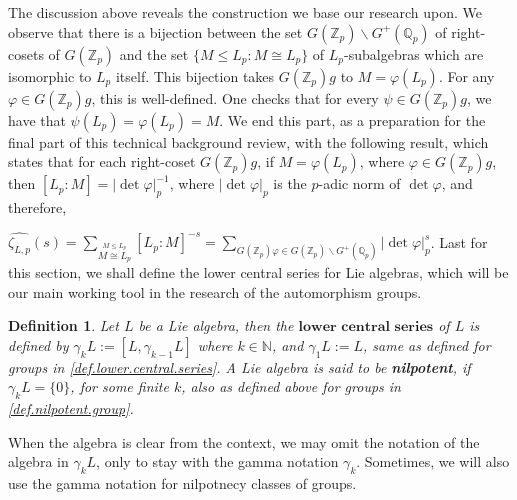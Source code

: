\documentclass[12pt]{article}
\newtheorem{definition}[theorem]{Definition}
\begin{document}
The discussion above reveals the construction we base our research upon.
We observe that there is a bijection between the set $G(\mathbb{Z}_p)\backslash G^+(\mathbb{Q}_p)$ of right-cosets of $G(\mathbb{Z}_p)$ and the set $\{M\leq L_{p} : M\cong L_{p}\}$ of $L_{p}$-subalgebras which are isomorphic to $L_{p}$ itself. This bijection takes $G(\mathbb{Z}_p)g$ to $M=\varphi(L_{p})$. For any $\varphi\in G(\mathbb{Z}_p)g$, this is well-defined. One checks that for every $\psi\in G(\mathbb{Z}_p)g$, we have that $\psi(L_{p})=\varphi(L_{p})=M$.
We end this part, as a preparation for the final part of this technical background review, with the following result, which states that for each right-coset $G(\mathbb{Z}_p)g$, if $M=\varphi(L_{p})$, where $\varphi\in G(\mathbb{Z}_p)g$, then $[L_{p}:M]=|\det\varphi|_p^{-1}$, where $|\det\varphi|_p$ is the $p$-adic norm of $\det\varphi$, and therefore,\par $\hat{\zeta_{L,p}}(s)=\underset{\overset{\scriptscriptstyle M\leq L_{p}}{\scriptscriptstyle M\cong L_{p}}}{\sum}[L_{p}:M]^{-s}=\underset{\scriptscriptstyle G(\mathbb{Z}_p)\varphi\in G(\mathbb{Z}_p)\backslash G^+(\mathbb{Q}_p)}{\sum}|\det\varphi|_p^s$.
Last for this section, we shall define the lower central series for Lie algebras, which will be our main working tool in the research of the automorphism groups.
\begin{definition}
Let $L$ be a Lie algebra, then the $\textbf{lower central series}$ of $L$ is defined by $\gamma_k L:=[L,\gamma_{k-1}L]$ where $k\in\mathbb{N}$, and $\gamma_1 L:=L$, same as defined for groups in \ref{def.lower.central.series}. A Lie algebra is said to be \textbf{nilpotent}, if $\gamma_k L=\{0\}$, for some finite $k$, also as defined above for groups in \ref{def.nilpotent.group}.
\end{definition}
When the algebra is clear from the context, we may omit the notation of the algebra in $\gamma_k L$, only to stay with the gamma notation $\gamma_k$. Sometimes, we will also use the gamma notation for nilpotnecy classes of groups.
\end{document}
